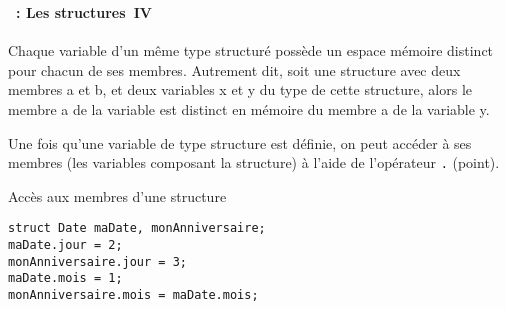\begin{frame}[containsverbatim]
  \frametitle{\secname}
  \framesubtitle{\subsecname~: Les structures~IV} 

  Chaque variable d'un même type structuré possède un espace mémoire distinct pour chacun de ses membres. Autrement dit, soit une structure avec
  deux membres a et b, et deux variables x et y du type de cette structure, alors le membre a de la variable est distinct en mémoire du membre a 
  de la variable y.
  \vspace{0.3cm}
  \par
  Une fois qu'une variable de type structure est définie, on peut accéder à ses membres (les variables composant la structure) à l'aide
  de l'opérateur \verb|.| (point).
  {\small\begin{exampleblock}{Accès aux membres d'une structure}
    \begin{verbatim}
struct Date maDate, monAnniversaire;
maDate.jour = 2;
monAnniversaire.jour = 3;
maDate.mois = 1;
monAnniversaire.mois = maDate.mois;\end{verbatim}
  \end{exampleblock}}
\end{frame}

